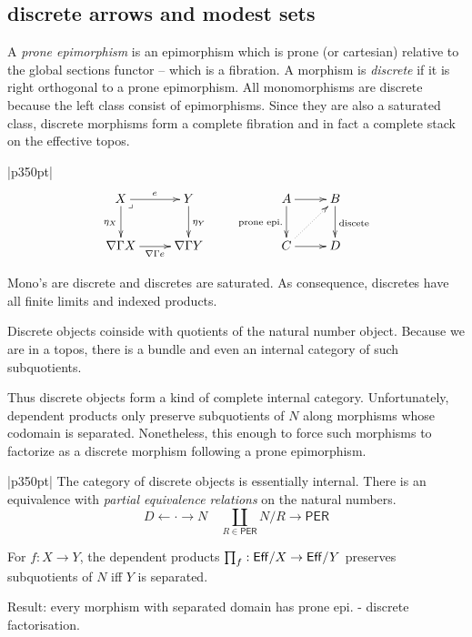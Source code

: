 \documentclass[12pt,a4paper]{article}
\theoremstyle{definition}
\newcommand\hide[1]{}
\newenvironment{blackboard}{\begin{tabular}{|p{350pt}|}\hline} {\\ \hline \end{tabular} }
\begin{document}
\subsection{discrete arrows and modest sets}
A \emph{prone epimorphism} is an epimorphism which is prone (or cartesian) relative to the global sections functor -- which is a fibration.
A morphism is \emph{discrete} if it is right orthogonal to a prone epimorphism. All monomorphisms are discrete because the left class consist of epimorphisms. Since they are also a saturated class, discrete morphisms form a complete fibration and in fact a complete stack on the effective topos.

\begin{blackboard}
\[\xymatrix{
X\ar[r]^e\ar[d]_{\eta_X}\ar@{}[dr]|<\lrcorner & Y\ar[d]^{\eta_Y}\\
\nabla\Gamma X\ar[r]_{\nabla\Gamma e} & \nabla\Gamma Y
}\qquad
\xymatrix{
A\ar[r]\ar[d]_{\textrm{prone epi.}} & B\ar[d]^{\textrm{discete}}\\
C\ar[r]\ar@{.>}[ur] & D
}
\]

Mono's are discrete and discretes are saturated. As consequence, discretes have all finite limits and indexed products.
\end{blackboard}

Discrete objects coinside with quotients of the natural number object. Because we are in a topos, there is a bundle and even an internal category of such subquotients. 
\hide{laat zien wat je bedoelt}
Thus discrete objects form a kind of complete internal category. Unfortunately, dependent products only preserve subquotients of $N$ along morphisms whose codomain is separated. Nonetheless, this enough to force such morphisms to factorize as a discrete morphism following a prone epimorphism.

\begin{blackboard}
The category of discrete objects is essentially internal. There is an equivalence with \emph{partial equivalence relations} on the natural numbers.
\[ D \leftarrow \cdot \rightarrow N\quad \coprod_{R\in \mathsf{PER}} N/R \to \mathsf{PER} \]

For $f:X\to Y$, the dependent products $\prod_f:\mathsf{Eff}/X\to \mathsf{Eff}/Y$ preserves subquotients of $N$ iff $Y$ is separated.

Result: every morphism with separated domain has prone epi. - discrete factorisation.
\end{blackboard}
\end{document}
